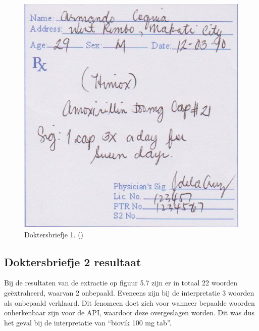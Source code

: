 \begin{figure}
	
	\includegraphics[width=\textwidth,height=\textheight,keepaspectratio]{../doktersbriefjes/dokterbriefje_1.jpg}
	\captionsetup{justification=centering,margin=2cm}
	\caption{Doktersbriefje 1. (\cite{Tacio2013})}
	\centering
\end{figure}
\clearpage

\subsection{Doktersbriefje 2 resultaat}
Bij de resultaten van de extractie op figuur 5.7 zijn er in totaal 22 woorden geëxtraheerd, waarvan 2 onbepaald. Eveneens zijn bij de interpretatie 3 woorden als onbepaald verklaard. Dit fenomeen doet zich voor wanneer bepaalde woorden onherkenbaar zijn voor de API, waardoor deze overgeslagen worden. Dit was dus het geval bij de interpretatie van “biovik 100 mg tab”. 


